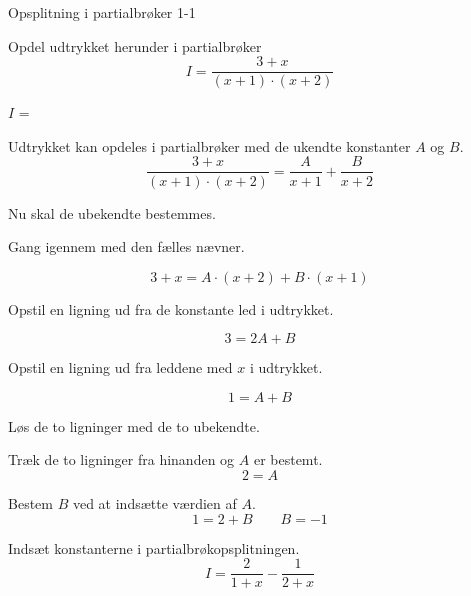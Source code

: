 \documentclass{article}
\begin{document}
\tableofcontents

\begin{exercise}{Opsplitning i partialbrøker 1-1}

Opdel udtrykket herunder i partialbrøker
\[
I = \frac{3 + x}{(x + 1) \cdot (x + 2)}
\]

$I$ = 

\hint
Udtrykket kan opdeles i partialbrøker med de ukendte konstanter $A$ og $B$.
\[
\frac{3 + x}{(x + 1) \cdot (x + 2)} =
\frac{A}{x + 1} + \frac{B}{x + 2}
\]

\hint
Nu skal de ubekendte bestemmes.

\hint
Gang igennem med den fælles nævner.

\hint
\[
3 + x = A \cdot (x + 2) + B \cdot (x + 1)
\]

\hint
Opstil en ligning ud fra de konstante led i udtrykket.

\hint
\[
3 = 2A + B
\]

\hint
Opstil en ligning ud fra leddene med $x$ i udtrykket.

\hint
\[
1 = A + B
\]

\hint
Løs de to ligninger med de to ubekendte.

\hint
Træk de to ligninger fra hinanden og $A$ er bestemt.
\[
2 = A
\]

\hint
Bestem $B$ ved at indsætte værdien af $A$.
\[
1 = 2 + B \qquad B = -1
\]

\hint
Indsæt konstanterne i partialbrøkopsplitningen.
\[
I = \frac{2}{1 + x} - \frac{1}{2 + x}
\]



\end{exercise}
\end{document}
